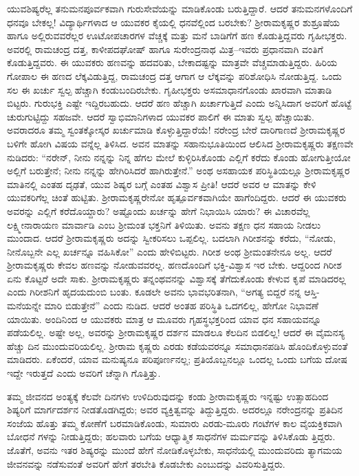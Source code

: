 ಯುವಶಿಷ್ಯರೆಲ್ಲ ತನುಮನಪೂರ್ವಕವಾಗಿ ಗುರುಸೇವೆಯನ್ನು ಮಾಡಿಕೊಂಡು ಬರುತ್ತಿದ್ದಾರೆ. ಆದರೆ ತನುಮನಗಳೊಂದಿಗೆ ಧನವೂ ಬೇಕಲ್ಲ! ವಿದ್ಯಾರ್ಥಿಗಳಾದ ಆ ಯುವಕರ ಕೈಯಲ್ಲಿ ಧನವೆಲ್ಲಿಂದ ಬರಬೇಕು? ಶ್ರೀರಾಮಕೃಷ್ಣರ ಶುಶ್ರೂಷೆಯ ಹಾಗೂ ಅಲ್ಲಿರುವವರೆಲ್ಲರ ಊಟೋಪಚಾರಗಳ ವೆಚ್ಚಕ್ಕೆ ಮತ್ತು ಮನೆ ಬಾಡಿಗೆಗೆ ಹಣ ಕೊಡುತ್ತಿದ್ದವರು ಗೃಹೀಭಕ್ತರು. ಅವರಲ್ಲಿ ರಾಮಚಂದ್ರ ದತ್ತ, ಕಾಳೀಪದಘೋಷ್ ಹಾಗೂ ಸುರೇಂದ್ರನಾಥ ಮಿತ್ರ–ಇವರು ಪ್ರಧಾನವಾಗಿ ವಂತಿಗೆ ಕೊಡುತ್ತಿದ್ದವರು. ಈ ಯುವಕರು ಹಣವನ್ನು ಹದವರಿತು, ಬೇಕಾದಷ್ಟನ್ನು ಮಾತ್ರವೇ ವೆಚ್ಚಮಾಡುತ್ತಿದ್ದರು. ಹಿರಿಯ ಗೋಪಾಲ ಈ ಹಣದ ಲೆಕ್ಕವಿಡುತ್ತಿದ್ದ, ರಾಮಚಂದ್ರ ದತ್ತ ಆಗಾಗ ಆ ಲೆಕ್ಕವನ್ನು ಪರಿಶೋಧಿಸಿ ನೋಡುತ್ತಿದ್ದ. ಒಂದು ಸಲ ಈ ಖರ್ಚು ಸ್ವಲ್ಪ ಹೆಚ್ಚಾಗಿ ಕಂಡುಬಂದಿರಬೇಕು. ಗೃಹೀಭಕ್ತರು ಅಸಮಾಧಾನಗೊಂಡು ಖಾರವಾಗಿ ಮಾತಾಡಿ ಬಿಟ್ಟರು. ಗುರುಭಕ್ತಿ ಎಷ್ಟೇ ಇದ್ದಿರಬಹುದು. ಆದರೆ ಹಣ ಹೆಚ್ಚಾಗಿ ಖರ್ಚಾಗುತ್ತಿದೆ ಎಂದು ಅನ್ನಿಸಿದಾಗ ಅವರಿಗೆ ಹೊಟ್ಟೆ ಚುರುಗುಟ್ಟಿದ್ದು ಸಹಜವೇ. ಆದರೆ ಸ್ವಾಭಿಮಾನಿಗಳಾದ ಯುವಕರ ಪಾಲಿಗೆ ಈ ಮಾತು ಸ್ವಲ್ಪ ಹೆಚ್ಚಾಯಿತು. ಅವರಾದರೂ ತಮ್ಮ ಸ್ವಂತಕ್ಕೋಸ್ಕರ ಖರ್ಚುಮಾಡಿ ಕೊಳ್ಳುತ್ತಿದ್ದಾರೆಯೆ! ನರೇಂದ್ರ ಬೇರೆ ದಾರಿಗಾಣದೆ ಶ್ರೀರಾಮಕೃಷ್ಣರ ಬಳಿಗೇ ಹೋಗಿ ವಿಷಯ ವನ್ನೆಲ್ಲ ತಿಳಿಸಿದ. ಅವನ ಮಾತನ್ನು ಸಹಾನುಭೂತಿಯಿಂದ ಆಲಿಸಿದ ಶ್ರೀರಾಮಕೃಷ್ಣರು ತಕ್ಷಣವೇ ನುಡಿದರು: “ನರೇನ್, ನೀನು ನನ್ನನ್ನು ನಿನ್ನ ಹೆಗಲ ಮೇಲೆ ಕುಳ್ಳಿರಿಸಿಕೊಂಡು ಎಲ್ಲಿಗೆ ಕರೆದು ಕೊಂಡು ಹೋಗುತ್ತೀಯೋ ಅಲ್ಲಿಗೆ ಬರುತ್ತೇನೆ; ನೀನು ನನ್ನನ್ನು ಹೇಗಿರಿಸಿದರೆ ಹಾಗಿರುತ್ತೇನೆ.” ಅಂಥ ಅಸಹಾಯಕ ಪರಿಸ್ಥಿತಿಯಲ್ಲೂ ಶ್ರೀರಾಮಕೃಷ್ಣರ ಮಾತಿನಲ್ಲಿ ಎಂತಹ ದೃಢತೆ, ಯುವ ಶಿಷ್ಯರ ಬಗ್ಗೆ ಎಂತಹ ವಿಶ್ವಾಸ ಪ್ರೀತಿ! ಆದರೆ ಅವರ ಆ ಮಾತನ್ನು ಕೇಳಿ ಯುವಕರಿಗೆಲ್ಲ ಚಿಂತೆ ಹುಟ್ಟಿತು. ಶ್ರೀರಾಮಕೃಷ್ಣರೇನೋ ಹೃತ್ಪೂರ್ವಕವಾಗಿಯೇ ಹಾಗೆಂದಿದ್ದರು. ಆದರೆ ಈ ಯುವಕರು ಅವರನ್ನು ಎಲ್ಲಿಗೆ ಕರೆದೊಯ್ದಾರು? ಅಷ್ಟೊಂದು ಖರ್ಚನ್ನು ಹೇಗೆ ನಿಭಾಯಿಸಿ ಯಾರು? ಈ ವಿಚಾರವೆಲ್ಲ ಲಕ್ಷ್ಮೀನಾರಾಯಣ ಮಾರ್ವಾಡಿ ಎಂಬ ಶ್ರೀಮಂತ ಭಕ್ತನಿಗೆ ತಿಳಿಯಿತು. ಅವನು ತಕ್ಷಣ ಧನ ಸಹಾಯ ನೀಡಲು ಮುಂದಾದ. ಆದರೆ ಶ್ರೀರಾಮಕೃಷ್ಣರು ಅದನ್ನು ಸ್ವೀಕರಿಸಲು ಒಪ್ಪಲಿಲ್ಲ. ಬದಲಾಗಿ ಗಿರೀಶನನ್ನು ಕರೆದು, “ನೋಡು, ನೀನೊಬ್ಬನೇ ಎಲ್ಲ ಖರ್ಚನ್ನೂ ವಹಿಸಿಕೋ” ಎಂದು ಹೇಳಿಬಿಟ್ಟರು. ಗಿರೀಶ ಅಂಥ ಶ್ರೀಮಂತನೇನೂ ಅಲ್ಲ. ಆದರೆ ಶ್ರೀರಾಮಕೃಷ್ಣರು ಕೇವಲ ಹಣವನ್ನು ನೋಡುವವರಲ್ಲ. ಹಣದೊಂದಿಗೆ ಭಕ್ತಿ-ವಿಶ್ವಾಸ ಇರ ಬೇಕು. ಆದ್ದರಿಂದ ಗಿರೀಶ ಏನು ಕೊಟ್ಟರೆ ಅದೇ ಸಾಕು. ಶ್ರೀರಾಮಕೃಷ್ಣರು ತನ್ನಂಥವನನ್ನು ವಿಶ್ವಾಸಕ್ಕೆ ತೆಗೆದುಕೊಂಡು ಕೇಳುವ ಕೃಪೆ ಮಾಡಿದರಲ್ಲ ಎಂದು ಗಿರೀಶನಿಗೆ ಹೃದಯದುಂಬಿ ಬಂತು. ಕೂಡಲೇ ಅವನು ಭಾವಭರಿತನಾಗಿ, “ಅಗತ್ಯ ಬಿದ್ದರೆ ನನ್ನ ಆಸ್ತಿ-ಮನೆಯನ್ನೇ ಮಾರಿ ಬಿಡುತ್ತೇನೆ” ಎಂದು ನುಡಿದ. ಆದರೆ ಅಂತಹ ಪರಿಸ್ಥಿತಿ ಒದಗಲಿಲ್ಲ, ಹೇಗೋ ನಿಭಾವಣೆ ಯಾಯಿತು. ಅಂದಿನಿಂದ ಆ ಯುವಕರು ಮಾತ್ರ ಆ ಮೂವರು ಗೃಹಸ್ಥಭಕ್ತರಿಂದ ಯಾವ ಧನ ಸಹಾಯವನ್ನೂ ಪಡೆಯಲಿಲ್ಲ. ಅಷ್ಟೇ ಅಲ್ಲ, ಅವರನ್ನು ಶ್ರೀರಾಮಕೃಷ್ಣರ ದರ್ಶನ ಮಾಡಲೂ ಕೆಲದಿನ ಬಿಡಲಿಲ್ಲ! ಆದರೆ ಈ ವೈಮನಸ್ಯ ಹೆಚ್ಚು ದಿನ ಮುಂದುವರಿಯಲಿಲ್ಲ. ಶ್ರೀರಾಮ ಕೃಷ್ಣರು ಎರಡು ಕಡೆಯವರನ್ನೂ ಸಮಾಧಾನಪಡಿಸಿ ಹೊಂದಿಕೊಳ್ಳುವಂತೆ ಮಾಡಿದರು. ಏಕೆಂದರೆ, ಯಾವ ಮನುಷ್ಯನೂ ಪರಿಪೂರ್ಣನಲ್ಲ; ಪ್ರತಿಯೊಬ್ಬನಲ್ಲೂ ಒಂದಲ್ಲ ಒಂದು ಬಗೆಯ ದೋಷ ಇದ್ದೇ ಇರುತ್ತದೆ ಎಂದು ಅವರಿಗೆ ಚೆನ್ನಾಗಿ ಗೊತ್ತಿತ್ತು.

ತಮ್ಮ ಜೀವನದ ಅಂತ್ಯಕ್ಕೆ ಕೆಲವೇ ದಿನಗಳು ಉಳಿದಿರುವುದನ್ನು ಕಂಡು ಶ್ರೀರಾಮಕೃಷ್ಣರು ಇನ್ನಷ್ಟು ಉತ್ಸಾಹದಿಂದ ಶಿಷ್ಯರಿಗೆ ಮಾರ್ಗದರ್ಶನ ನೀಡತೊಡಗಿದ್ದರು; ಅವರ ವ್ಯಕ್ತಿತ್ವವನ್ನು ತಿದ್ದುತ್ತಿದ್ದರು. ಅದರಲ್ಲೂ ನರೇಂದ್ರನನ್ನು ಪ್ರತಿದಿನ ಸಂಜೆಯ ಹೊತ್ತು ತಮ್ಮ ಕೋಣೆಗೆ ಬರಮಾಡಿಕೊಂಡು, ಸುಮಾರು ಎರಡು-ಮೂರು ಗಂಟೆಗಳ ಕಾಲ ವೈಯಕ್ತಿಕವಾಗಿ ಬೋಧನೆ ಗಳನ್ನು ನೀಡುತ್ತಿದ್ದರು; ಹಲವಾರು ಬಗೆಯ ಆಧ್ಯಾತ್ಮಿಕ ಸಾಧನೆಗಳ ಮರ್ಮವನ್ನು ತಿಳಿಸಿಕೊಡು ತ್ತಿದ್ದರು. ಜೊತೆಗೆ, ಅವನು ಇತರ ಶಿಷ್ಯರನ್ನು ಮುಂದೆ ಹೇಗೆ ನೋಡಿಕೊಳ್ಳಬೇಕು, ಸಾಧನೆಯಲ್ಲಿ ಮುಂದುವರಿದು ತ್ಯಾಗಮಯ ಜೀವನವನ್ನು ನಡೆಸುವಂತೆ ಅವರಿಗೆ ಹೇಗೆ ತರಬೇತಿ ಕೊಡಬೇಕು ಎಂಬುದನ್ನು ವಿವರಿಸುತ್ತಿದ್ದರು.

